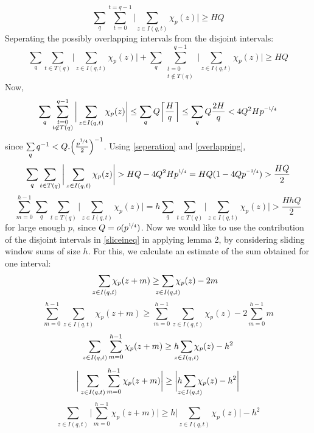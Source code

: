 \documentclass{report}
\begin{document}
$$\sum_q\sum\limits_{t=0}^{t=q-1}\bigg \lvert\sum\limits_{z\in I(q,t)}\chi_p(z)\bigg \rvert \geq HQ$$
Seperating the possibly overlapping intervals from the disjoint intervals:
\begin{equation} \label{seperation}
\sum_q\sum\limits_{t\in T(q)}\bigg \lvert\sum\limits_{z\in I(q,t)}\chi_p(z)\bigg \rvert+\sum_q\sum\limits_{\substack{t=0\\t\not \in T(q)}}^{q-1}\bigg \lvert\sum\limits_{z\in I(q,t)}\chi_p(z)\bigg \rvert \geq HQ
\end{equation}
Now,
\begin{equation} \label{overlapping}
\sum_q\sum\limits_{\substack{t=0\\t\not \in T(q)}}^{q-1}\bigg\lvert\sum\limits_{z\in I(q,t) }\chi_p(z)\bigg \rvert \leq \sum\limits_q Q\bigg\lceil\frac{H}{q}\bigg\rceil \leq \sum\limits_q Q\frac{2H}{q} < 4Q^2 Hp^{\nicefrac{-1}{4}}
\end{equation}
since $\sum\limits_q q^{-1} < Q.\Big(\frac{p^{\nicefrac{1}{4}}}{2}\Big)^{-1}$. Using \ref{seperation} and \ref{overlapping},
$$\sum_q\sum\limits_{t\in T(q)}\bigg \lvert\sum\limits_{z\in I(q,t)}\chi_p(z)\bigg \rvert > HQ - 4Q^2 Hp^{\nicefrac{1}{4}}=HQ(1-4Qp^{\nicefrac{-1}{4}})>\frac{HQ}{2}$$
\begin{equation} \label{sliceineq}
\sum\limits_{m=0}^{h-1}\sum_q\sum\limits_{t\in T(q)}\bigg \lvert\sum\limits_{z\in I(q,t)}\chi_p(z)\bigg \rvert = h \sum_q\sum\limits_{t\in T(q)}\bigg \lvert\sum\limits_{z\in I(q,t)}\chi_p(z)\bigg \rvert > \frac{HhQ}{2}
\end{equation}
for large enough $p$, since $Q=o(p^{\nicefrac{1}{4}})$. Now we would like to use the contribution of the disjoint intervals in \ref{sliceineq} in applying lemma 2, by considering sliding window sums of size $h$. For this, we calculate an estimate of the sum obtained for one interval:
$$\sum\limits_{\mathclap {z\in I(q,t)}}\chi_p(z+m)\geq \sum\limits_{\mathclap{z\in I(q,t)}}\chi_p(z)-2m$$
$$\sum\limits_{m=0}^{h-1}\sum\limits_{z\in I(q,t)}\chi_p(z+m)\geq \sum\limits_{m=0}^{h-1}\sum\limits_{z\in I(q,t)}\chi_p(z)-2 \sum\limits_{m=0}^{h-1}m$$
$$\sum\limits_{z\in I(q,t)}\sum\limits_{m=0}^{h-1}\chi_p(z+m)\geq h\sum\limits_{\mathclap{z\in I(q,t)}}\chi_p(z)-h^2$$
$$\bigg \lvert\sum\limits_{z\in I(q,t)} \sum\limits_{m=0}^{h-1}\chi_p(z+m) \bigg \rvert \geq \bigg \lvert h\sum\limits_{\mathclap{z\in I(q,t)}}\chi_p(z)-h^2 \bigg \rvert$$
$$\sum\limits_{z\in I(q,t)}\bigg \lvert \sum\limits_{m=0}^{h-1}\chi_p(z+m) \bigg \rvert \geq h\bigg \lvert \sum\limits_{z\in I(q,t)}\chi_p(z)\bigg \rvert-h^2 $$
\end{document}
